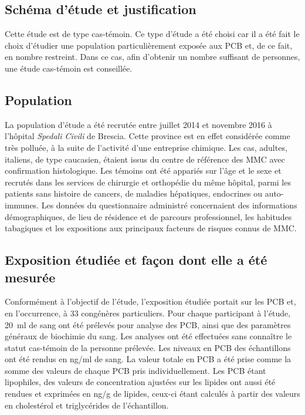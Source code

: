 \documentclass[10pt,english,french]{article}
\begin{document}
\subsection{Schéma d'étude et justification}
Cette étude est de type cas-témoin. Ce type d'étude a été choisi car il a été fait le choix d'étudier une population particulièrement exposée aux PCB et, de ce fait, en nombre restreint. Dans ce cas, afin d'obtenir un nombre suffisant de personnes, une étude cas-témoin est conseillée. 

\subsection{Population}
La population d'étude a été recrutée entre juillet 2014 et novembre 2016 à l'hôpital \emph{Spedali Civili} de Brescia. Cette province est en effet considérée comme très polluée, à la suite de l'activité d'une entreprise chimique. Les cas, adultes, italiens, de type caucasien, étaient issus du centre de référence des MMC avec confirmation histologique. Les témoins ont été appariés sur l'âge et le sexe et recrutés dans les services de chirurgie et orthopédie du même hôpital, parmi les patients sans histoire de cancers, de maladies hépatiques, endocrines ou auto-immunes. Les données du questionnaire administré concernaient des informations démographiques, de lieu de résidence et de parcours professionnel, les habitudes tabagiques et les expositions aux principaux facteurs de risques connus de MMC.

\subsection{Exposition étudiée et façon dont elle a été mesurée}
Conformément à l'objectif de l'étude, l'exposition étudiée portait sur les PCB et, en l'occurrence, à 33 congénères particuliers. Pour chaque participant à l'étude, 20~ml de sang ont été prélevés pour analyse des PCB, ainsi que des paramètres généraux de biochimie du sang. Les analyses ont été effectuées sans connaître le statut cas-témoin de la personne prélevée. Les niveaux en PCB des échantillons ont été rendus en ng/ml de sang. La valeur totale en PCB a été prise comme la somme des valeurs de chaque PCB pris individuellement. Les PCB étant lipophiles, des valeurs de concentration ajustées sur les lipides ont aussi été rendues et exprimées en ng/g de lipides, ceux-ci étant calculés à partir des valeurs en cholestérol et triglycérides de l'échantillon.
\end{document}
